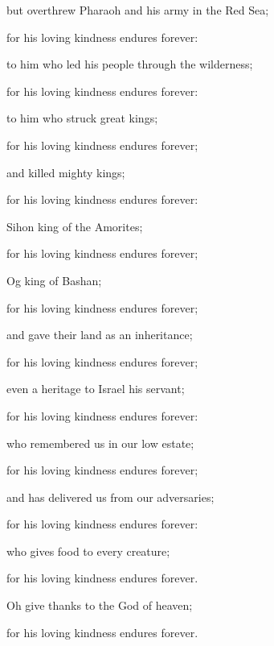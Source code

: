 {\par }{\Q {}but overthrew Pharaoh and his army in the Red Sea;
\par }{\QB for his loving kindness endures forever:
\par }{\Q {}to him who led his people through the wilderness;
\par }{\QB for his loving kindness endures forever:
\par }{\Q {}to him who struck great kings;
\par }{\QB for his loving kindness endures forever;
\par }{\Q {}and killed mighty kings;
\par }{\QB for his loving kindness endures forever:
\par }{\Q {}Sihon king of the Amorites;
\par }{\QB for his loving kindness endures forever;
\par }{\Q {}Og king of Bashan;
\par }{\QB for his loving kindness endures forever;
\par }{\Q {}and gave their land as an inheritance;
\par }{\QB for his loving kindness endures forever;
\par }{\Q {}even a heritage to Israel his servant;
\par }{\QB for his loving kindness endures forever:
\par }{\Q {}who remembered us in our low estate;
\par }{\QB for his loving kindness endures forever;
\par }{\Q {}and has delivered us from our adversaries;
\par }{\QB for his loving kindness endures forever:
\par }{\Q {}who gives food to every creature;
\par }{\QB for his loving kindness endures forever.
\par }{\Q {}Oh give thanks to the God of heaven;
\par }{\QB for his loving kindness endures forever.

}
